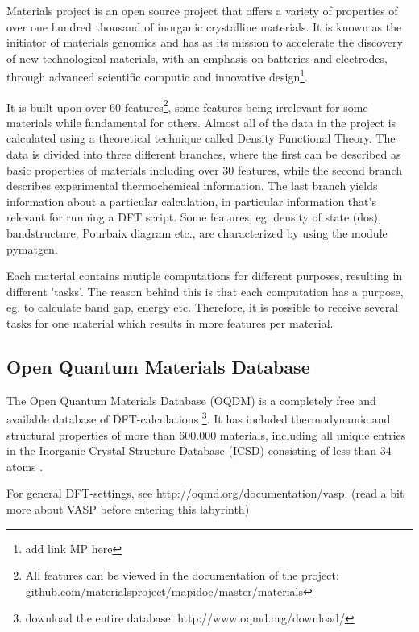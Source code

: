 Materials project is an open source project that offers a variety of properties of over one hundred thousand of inorganic crystalline materials. It is known as the initiator of materials genomics and has as its mission to accelerate the discovery of new technological materials, with an emphasis on batteries and electrodes, through advanced scientific computic and innovative design\footnote{add link MP here}.

It is built upon over 60 features\footnote{All features can be viewed in the documentation of the project: github.com/materialsproject/mapidoc/master/materials}, some features being irrelevant for some materials while fundamental for others. Almost all of the data in the project is calculated using a theoretical technique called Density Functional Theory. The data is divided into three different branches, where the first can be described as basic properties of materials including over $30$ features, while the second branch describes experimental thermochemical information. The last branch yields information about a particular calculation, in particular information that's relevant for running a DFT script. Some features, eg. density of state (dos), bandstructure, Pourbaix diagram etc., are characterized by using the module pymatgen.

Each material contains mutiple computations for different purposes, resulting in different 'tasks'. The reason behind this is that each computation has a purpose, eg. to calculate band gap, energy etc. Therefore, it is possible to receive several tasks for one material which results in more features per material.

\subsection{Open Quantum Materials Database}

The Open Quantum Materials Database (OQDM) is a completely free and available database of DFT-calculations \footnote{download the entire database:  http://www.oqmd.org/download/}. It has included thermodynamic and structural properties of more than $600.000$ materials, including all unique entries in the Inorganic Crystal Structure Database (ICSD) consisting of less than $34$ atoms \cite{Kirklin2015}.

For general DFT-settings, see http://oqmd.org/documentation/vasp. (read a bit more about VASP before entering this labyrinth)



